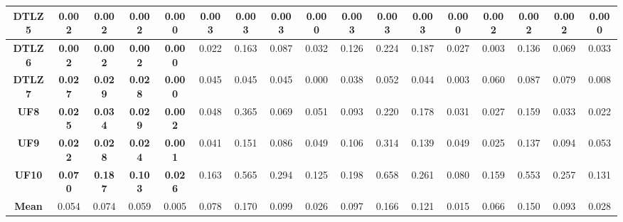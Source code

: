\begin{table*}[t]
{\begin{tabular}{cc|c|c|c|c|c|c|c|c|c|c|c|c|c|c|c}
\multicolumn{1}{c|}{\textbf{DTLZ5}} & \textbf{0.002} & \textbf{0.002} & \textbf{0.002} & \textbf{0.000}& 0.003        & 0.003        & 0.003         & 0.000        & 0.003        & 0.003        & 0.003         & 0.000        & 0.002          & 0.002          & 0.002          & 0.000           \\ \hline
\multicolumn{1}{c|}{\textbf{DTLZ6}} & \textbf{0.002} & \textbf{0.002} & \textbf{0.002} & \textbf{0.000}& 0.022        & 0.163        & 0.087         & 0.032        & 0.126        & 0.224        & 0.187         & 0.027        & 0.003          & 0.136          & 0.069          & 0.033           \\ \hline
\multicolumn{1}{c|}{\textbf{DTLZ7}} & \textbf{0.027} & \textbf{0.029} & \textbf{0.028} & \textbf{0.000}& 0.045        & 0.045        & 0.045         & 0.000        & 0.038        & 0.052        & 0.044         & 0.003        & 0.060          & 0.087          & 0.079          & 0.008           \\ \hline
\multicolumn{1}{c|}{\textbf{UF8}}   & \textbf{0.025} & \textbf{0.034} & \textbf{0.029} & \textbf{0.002}& 0.048        & 0.365        & 0.069         & 0.051        & 0.093        & 0.220        & 0.178         & 0.031        & 0.027          & 0.159          & 0.033          & 0.022           \\ \hline
\multicolumn{1}{c|}{\textbf{UF9}}   & \textbf{0.022} & \textbf{0.028} & \textbf{0.024} & \textbf{0.001}& 0.041        & 0.151        & 0.086         & 0.049        & 0.106        & 0.314        & 0.139         & 0.049        & 0.025          & 0.137          & 0.094          & 0.053           \\ \hline
\multicolumn{1}{c|}{\textbf{UF10}}  & \textbf{0.070} & \textbf{0.187} & \textbf{0.103} & \textbf{0.026}& 0.163        & 0.565        & 0.294         & 0.125        & 0.198        & 0.658        & 0.261         & 0.080        & 0.159          & 0.553          & 0.257          & 0.131           \\ \hline
\multicolumn{1}{c|}{\textbf{Mean}}  & 0.054          & 0.074          & 0.059          & 0.005         & 0.078        & 0.170        & 0.099         & 0.026        & 0.097        & 0.166        & 0.121         & 0.015        & 0.066          & 0.150          & 0.093          & 0.028           \\ \hline
\end{tabular}%
}
\end{table*}

